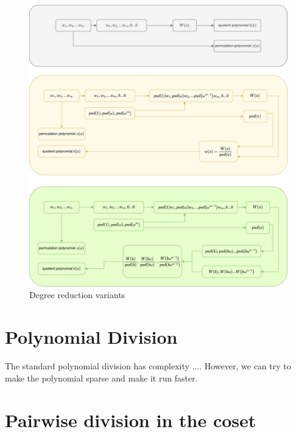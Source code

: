 \begin{figure}
    \centering
    \includegraphics[width=1\linewidth]{figures/degree_reduction_diagram.drawio.png}
    \caption{Degree reduction variants}
\end{figure}

\section{Polynomial Division}
The standard polynomial division has complexity .... 
However, we can try to make the polynomial sparse and make it run faster.

\section{Pairwise division in the coset}
